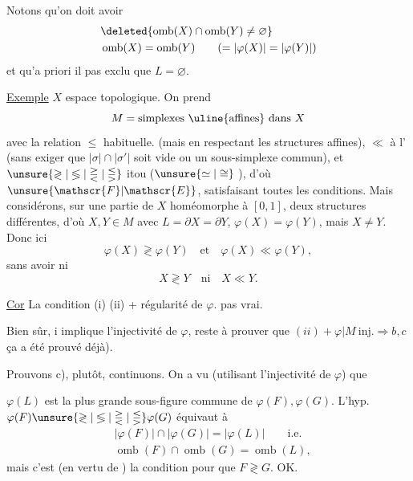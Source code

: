 
Notons qu'on  doit avoir
\[
\begin{aligned}
&\deleted{\operatorname{omb}(X)\cap\operatorname{omb}(Y)\ne\varnothing}\\
&\operatorname{omb}(X)=\operatorname{omb}(Y)\qquad (=|\varphi(X)|=|\varphi(Y)|)
\end{aligned}
\]
et qu'a priori il  pas exclu que $L=\varnothing$.

\uline{Exemple} $X$ espace topologique. On prend 
\[
M=\text{simplexes \uline{affines} dans }X
\]
avec la relation $\leq$ habituelle.  (mais en respectant les structures affines), $\ll$ à l' (sans exiger que $|\sigma|\cap|\sigma'|$ soit vide ou un sous-simplexe commun), et $\unsure{\gtrless|\lessgtr|\gtreqless|\lesseqgtr}$ itou ($\unsure{\simeq|\cong}$ ), d'où $\unsure{\mathscr{F}|\mathscr{E}}$, satisfaisant toutes les conditions. Mais considérons, sur une partie de $X$ homéomorphe à $[0,1]$, deux structures   différentes, d'où $X,Y\in M$ avec  $L=\partial X=\partial Y$, $\varphi(X)=\varphi(Y)$, mais $X\ne Y$. Donc ici
\[
\varphi(X)\gtrless\varphi(Y)\quad\text{et}\quad\varphi(X)\ll\varphi(Y),
\]
sans avoir ni
\[
X\gtrless Y\quad\text{ni}\quad X\ll Y.
\]


\uline{Cor} La condition (i)   (ii) + régularité de $\varphi$.   pas vrai.

Bien sûr, i implique l'injectivité de $\varphi$, reste à prouver que $(ii)+\varphi|M\ \text{inj.}\Rightarrow b,c$ \unsure{(}ça a été prouvé déjà).

Prouvons c), plutôt, continuons. On a vu (utilisant l'injectivité de $\varphi$) que


$\varphi(L)$ est la plus grande sous-figure commune de $\varphi(F),\varphi(G)$. L'hyp. $\varphi(F)\unsure{\gtrless|\lessgtr|\gtreqless|\lesseqgtr}\varphi(G)$ équivaut à
\[
\begin{aligned}
&|\varphi(F)|\cap|\varphi(G)|=|\varphi(L)|\qquad\text{i.e.}\\
&\operatorname{omb}(F)\cap\operatorname{omb}(G)=\operatorname{omb}(L),
\end{aligned}
\]
mais c'est (en vertu de ) la condition pour que $F\gtrless G$. OK.

